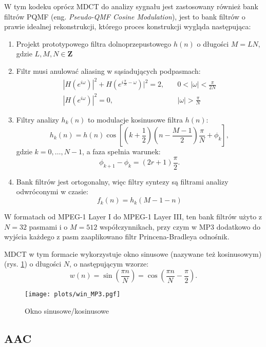 \documentclass[pl,12pt]{aghdpl}
\let\Oldsubsection\subsection%
\renewcommand{\subsection}{\FloatBarrier\Oldsubsection}
\begin{document}
W tym kodeku oprócz MDCT do analizy sygnału jest zastosowany również bank
filtrów PQMF (eng. \textit{Pseudo-QMF Cosine Modulation}), jest to bank filtrów
o prawie idealnej rekonstrukcji, którego proces konstrukcji wygląda
następująca:
\begin{enumerate}
  \item Projekt prototypowego filtra dolnoprzepustowego $h(n)$ o długości $M =
    LN$, gdzie $L, M, N \in \bm Z$
  \item Filtr musi anulować aliasing w sąsiadujących podpasmach: \[
      \begin{array}{rl}
        |H(e^{i\omega})|^2 + H(e^{i\frac{\pi}{N}-\omega})|^2 = 2, &
        \quad0<|\omega|<\frac{\pi}{2N} \\
        |H(e^{i\omega})|^2 = 0, & \quad|\omega| > \frac{\pi}{N}
      \end{array}\]
  \item Filtry analizy $h_k(n)$ to modulacje kosinusowe filtra $h(n)$:\[
      h_k(n) = h(n)\cos\left[\left(k+\frac{1}{2}\right)
      \left(n-\frac{M-1}{2}\right)\frac{\pi}{N}+\phi_k\right],\]
      gdzie $k = 0,\dotsc,N-1$, a faza spełnia warunek:\[
      \phi_{k+1}-\phi_k = (2r+1)\frac{\pi}{2}.\]
  \item Bank filtrów jest ortogonalny, więc filtry syntezy są filtrami analizy
    odwróconymi w czasie:\[
      f_k(n) = h_k(M-1-n)\]
\end{enumerate}
W formatach od MPEG-1 Layer I do MPEG-1 Layer III, ten bank filtrów użyto z $N = 32$
pasmami i o $M = 512$ współczynnikach, przy czym w MP3 dodatkowo do wyjścia każdego z
pasm zaaplikowano filtr Princena-Bradleya {\color{red}odnośnik}.

MDCT w tym formacie wykorzystuje okno sinusowe (nazywane też kosinusowym) (rys.
\ref{fig:win_MP3}) o długości $N$, o następującym wzorze:
\begin{equation}\label{eq:sine_win}
  w(n) = \sin\left(\frac{\pi n}{N}\right) = \cos\left(\frac{\pi n}{N} - \frac{\pi}{2}\right).
\end{equation}

\begin{figure}[!tbh]
  \centering
  \texttt{[image: plots/win\_MP3.pgf]}
  \caption{Okno sinusowe/kosinusowe}
  \label{fig:win_MP3}
\end{figure}

\subsection{AAC}
\end{document}
